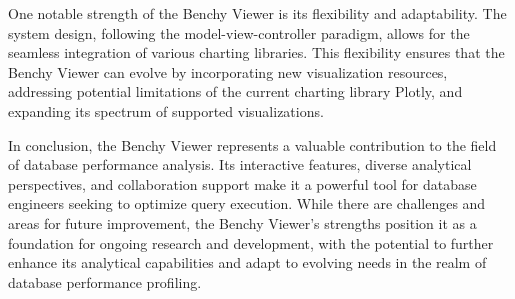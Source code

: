 One notable strength of the Benchy Viewer is its flexibility and adaptability. The system design, following the model-view-controller paradigm, allows for the seamless integration of various charting libraries. This flexibility ensures that the Benchy Viewer can evolve by incorporating new visualization resources, addressing potential limitations of the current charting library Plotly, and expanding its spectrum of supported visualizations.

In conclusion, the Benchy Viewer represents a valuable contribution to the field of database performance analysis. Its interactive features, diverse analytical perspectives, and collaboration support make it a powerful tool for database engineers seeking to optimize query execution. While there are challenges and areas for future improvement, the Benchy Viewer's strengths position it as a foundation for ongoing research and development, with the potential to further enhance its analytical capabilities and adapt to evolving needs in the realm of database performance profiling.

